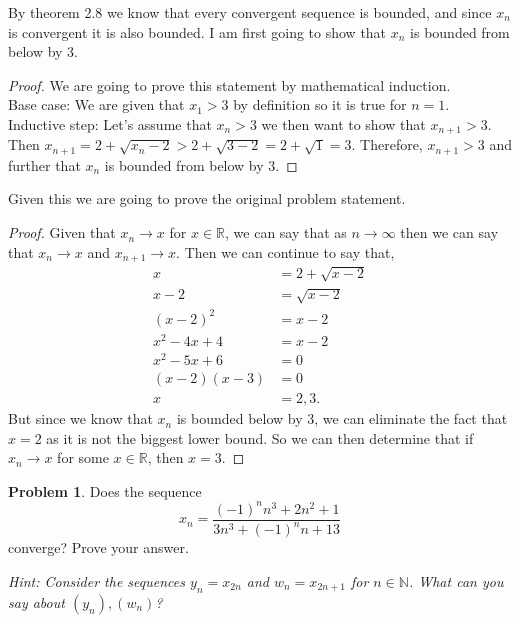 \documentclass[11pt]{article}
\theoremstyle{definition}
\newtheorem{problem}{Problem}
\newcommand{\N}{\mathbb{N}}
\newcommand{\R}{\mathbb{R}}
\begin{document}
By theorem 2.8 we know that every convergent sequence is bounded, and since $x_n$ is convergent it is also bounded. I am first going to show that $x_n$ is bounded from below by $3.$
\begin{proof}
We are going to prove this statement by mathematical induction.\\
Base case: We are given that $x_1>3$ by definition so it is true for $n=1$.\\
Inductive step: Let's assume that $x_n>3$ we then want to show that $x_{n+1}>3$. Then $x_{n+1} = 2 + \sqrt{x_n-2} > 2 + \sqrt{3-2} = 2 + \sqrt{1} = 3.$ Therefore, $x_{n+1} > 3$ and further that $x_n$ is bounded from below by $3.$
\end{proof}
Given this we are going to prove the original problem statement.
\begin{proof}
Given that $x_n \rightarrow x$ for $x\in \R$, we can say that as $n \rightarrow \infty$ then we can say that $x_n \rightarrow x$ and $x_{n+1} \rightarrow x$. Then we can continue to say that,
\begin{align*}
    x &= 2 + \sqrt{x - 2}\\
    x - 2 &= \sqrt{x - 2}\\
    (x - 2)^2 &= x - 2\\
    x^2 - 4x + 4 &= x - 2\\
    x^2 - 5x + 6 &= 0\\
    (x - 2)(x - 3) &= 0\\
    x &= 2, 3.
\end{align*} But since we know that $x_n$ is bounded below by 3, we can eliminate the fact that $x = 2$ as it is not the biggest lower bound. So we can then determine that if $x_n \rightarrow x$ for some $x\in \R$, then $x = 3.$
\end{proof}

\newpage


\begin{problem}
Does the sequence
\[
x_n = \frac{(-1)^n n^3 + 2 n^2 + 1}{3 n^3 + (-1)^n n + 13} 
\]
converge? Prove your answer. 

{\it Hint: Consider the sequences $y_n = x_{2n}$ and $w_n = x_{2n + 1}$ for $n \in \N$. What can you say about $(y_n), (w_n)$?}
\end{problem}
\end{document}
